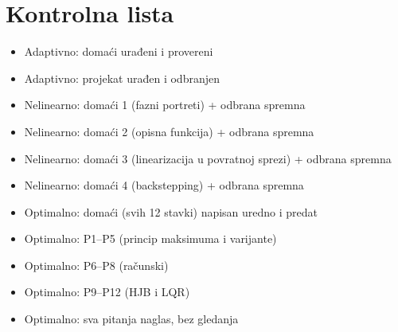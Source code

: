 \documentclass[11pt,a4paper,parskip=half,headsepline,numbers=noenddot]{scrartcl}
\begin{document}
\section{Kontrolna lista}

\begin{itemize}
\item[$\square$]
  Adaptivno: domaći urađeni i provereni
\item[$\square$]
  Adaptivno: projekat urađen i odbranjen
\item[$\square$]
  Nelinearno: domaći 1 (fazni portreti) + odbrana spremna
\item[$\square$]
  Nelinearno: domaći 2 (opisna funkcija) + odbrana spremna
\item[$\square$]
  Nelinearno: domaći 3 (linearizacija u povratnoj sprezi) + odbrana spremna
\item[$\square$]
  Nelinearno: domaći 4 (backstepping) + odbrana spremna
\item[$\square$]
  Optimalno: domaći (svih 12 stavki) napisan uredno i predat
\item[$\square$]
  Optimalno: P1--P5 (princip maksimuma i varijante)
\item[$\square$]
  Optimalno: P6--P8 (računski)
\item[$\square$]
  Optimalno: P9--P12 (HJB i LQR)
\item[$\square$]
  Optimalno: sva pitanja naglas, bez gledanja
\end{itemize}
\end{document}
